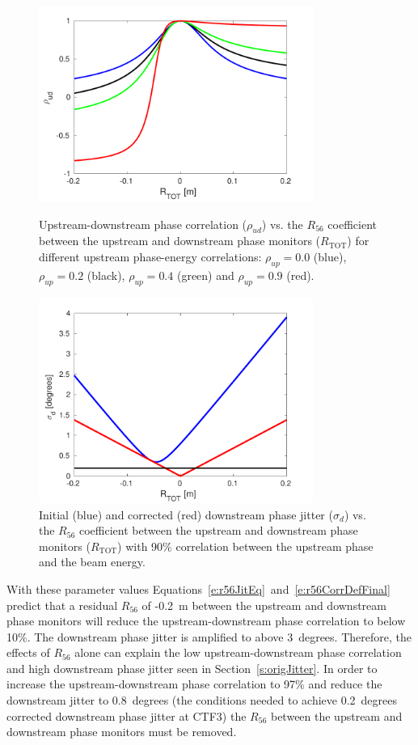 \begin{figure}
  \centering
  \includegraphics[width=0.8\textwidth]{Figures/propagation/corrVsR56_CTENCorr}
  \caption{Upstream-downstream phase correlation (\(\rho_{ud}\)) vs. the \(R_{56}\) coefficient between the upstream and downstream phase monitors (\(R_{\mathrm{TOT}}\)) for different upstream phase-energy correlations: \(\rho_{up}=0.0\) (blue), \(\rho_{up}=0.2\) (black), \(\rho_{up}=0.4\) (green) and \(\rho_{up}=0.9\) (red).}
  \label{f:corrVsR56_CTENCorr}
  \includegraphics[width=0.8\textwidth]{Figures/propagation/jitVsR56_90ctencorr}
  \caption{Initial (blue) and corrected (red) downstream phase jitter (\(\sigma_d\)) vs. the \(R_{56}\) coefficient between the upstream and downstream phase monitors (\(R_{\mathrm{TOT}}\)) with 90\% correlation between the upstream phase and the beam energy.}
  \label{f:jitVsR56_90ctencorr}
\end{figure}

With these parameter values Equations~\ref{e:r56JitEq}~and~\ref{e:r56CorrDefFinal} predict that a residual \(R_{56}\) of -0.2~m between the upstream and downstream phase monitors will reduce the upstream-downstream phase correlation to below 10\%. The downstream phase jitter is amplified to above 3~degrees. Therefore, the effects of \(R_{56}\) alone can explain the low upstream-downstream phase correlation and high downstream phase jitter seen in Section~\ref{s:origJitter}. In order to increase the upstream-downstream phase correlation to 97\% and reduce the downstream jitter to 0.8~degrees (the conditions needed to achieve 0.2~degrees corrected downstream phase jitter at CTF3) the \(R_{56}\) between the upstream and downstream phase monitors must be removed.

